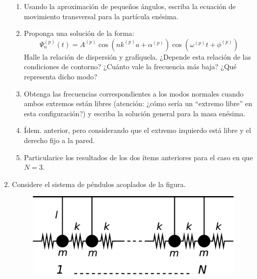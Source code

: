 \documentclass[11pt,spanish,a4paper]{article}
\begin{document}
\begin{enumerate}
\begin{enumerate}
\item Usando la aproximación de pequeños ángulos, escriba la ecuación de
movimiento transversal para la partícula enésima. 
\item Proponga una solución de la forma:
\[
\Psi_{n}^{(p)}(t)=A^{(p)}\cos\left(nk^{(p)}a+\alpha^{(p)}\right)\cos\left(\omega^{(p)}t+\phi^{(p)}\right)
\]
Halle la relación de dispersión y grafíquela. ¿Depende esta relación
de las condiciones de contorno? ¿Cuánto vale la frecuencia más baja?
¿Qué representa dicho modo? 
\item Obtenga las frecuencias correspondientes a los modos normales cuando
ambos extremos están libres (atención: ¿cómo sería un ``extremo libre''
en esta configuración?) y escriba la solución general para la masa
enésima. 
\item Ídem. anterior, pero considerando que el extremo izquierdo está libre
y el derecho fijo a la pared. 
\item Particularice los resultados de los dos ítems anteriores para el caso
en que $N=3$.
\end{enumerate}
\item Considere el sistema de péndulos acoplados de la figura. 
\begin{figure}[H]
\centering{}\includegraphics[clip,scale=0.25]{ej1-12}
\end{figure}



\end{enumerate}
\end{document}
